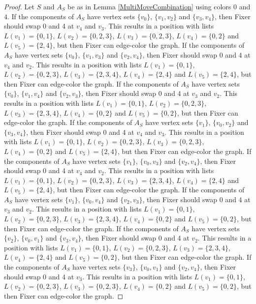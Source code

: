 \documentclass[12pt]{amsart}
\theoremstyle{plain}
\theoremstyle{definition}
\theoremstyle{remark}
\begin{document}
\begin{proof}
Let $S$ and $A_S$ be as in Lemma \ref{MultiMoveCombination} using colors $0$ and $4$. If the components of $A_S$ have vertex sets $\{v_0\}$, $\{v_1, v_2\}$ and $\{v_3, v_4\}$, then Fixer should swap 0 and 4 at $v_4$ and $v_3$. This results in a position with lists $L(v_1) = \{0, 1\}$, $L(v_2) = \{0, 2, 3\}$, $L(v_3) = \{0, 2, 3\}$, $L(v_4) = \{0, 2\}$ and $L(v_5) = \{2, 4\}$, but then Fixer can edge-color the graph.
If the components of $A_S$ have vertex sets $\{v_0\}$, $\{v_1, v_3\}$ and $\{v_2, v_4\}$, then Fixer should swap 0 and 4 at $v_4$ and $v_2$. This results in a position with lists $L(v_1) = \{0, 1\}$, $L(v_2) = \{0, 2, 3\}$, $L(v_3) = \{2, 3, 4\}$, $L(v_4) = \{2, 4\}$ and $L(v_5) = \{2, 4\}$, but then Fixer can edge-color the graph.
If the components of $A_S$ have vertex sets $\{v_0\}$, $\{v_1, v_4\}$ and $\{v_2, v_3\}$, then Fixer should swap 0 and 4 at $v_3$ and $v_2$. This results in a position with lists $L(v_1) = \{0, 1\}$, $L(v_2) = \{0, 2, 3\}$, $L(v_3) = \{2, 3, 4\}$, $L(v_4) = \{0, 2\}$ and $L(v_5) = \{0, 2\}$, but then Fixer can edge-color the graph.
If the components of $A_S$ have vertex sets $\{v_1\}$, $\{v_0, v_2\}$ and $\{v_3, v_4\}$, then Fixer should swap 0 and 4 at $v_4$ and $v_3$. This results in a position with lists $L(v_1) = \{0, 1\}$, $L(v_2) = \{0, 2, 3\}$, $L(v_3) = \{0, 2, 3\}$, $L(v_4) = \{0, 2\}$ and $L(v_5) = \{2, 4\}$, but then Fixer can edge-color the graph.
If the components of $A_S$ have vertex sets $\{v_1\}$, $\{v_0, v_3\}$ and $\{v_2, v_4\}$, then Fixer should swap 0 and 4 at $v_4$ and $v_2$. This results in a position with lists $L(v_1) = \{0, 1\}$, $L(v_2) = \{0, 2, 3\}$, $L(v_3) = \{2, 3, 4\}$, $L(v_4) = \{2, 4\}$ and $L(v_5) = \{2, 4\}$, but then Fixer can edge-color the graph.
If the components of $A_S$ have vertex sets $\{v_1\}$, $\{v_0, v_4\}$ and $\{v_2, v_3\}$, then Fixer should swap 0 and 4 at $v_3$ and $v_2$. This results in a position with lists $L(v_1) = \{0, 1\}$, $L(v_2) = \{0, 2, 3\}$, $L(v_3) = \{2, 3, 4\}$, $L(v_4) = \{0, 2\}$ and $L(v_5) = \{0, 2\}$, but then Fixer can edge-color the graph.
If the components of $A_S$ have vertex sets $\{v_2\}$, $\{v_0, v_1\}$ and $\{v_3, v_4\}$, then Fixer should swap 0 and 4 at $v_2$. This results in a position with lists $L(v_1) = \{0, 1\}$, $L(v_2) = \{0, 2, 3\}$, $L(v_3) = \{2, 3, 4\}$, $L(v_4) = \{2, 4\}$ and $L(v_5) = \{0, 2\}$, but then Fixer can edge-color the graph.
If the components of $A_S$ have vertex sets $\{v_3\}$, $\{v_0, v_1\}$ and $\{v_2, v_4\}$, then Fixer should swap 0 and 4 at $v_3$. This results in a position with lists $L(v_1) = \{0, 1\}$, $L(v_2) = \{0, 2, 3\}$, $L(v_3) = \{0, 2, 3\}$, $L(v_4) = \{0, 2\}$ and $L(v_5) = \{0, 2\}$, but then Fixer can edge-color the graph.

\end{proof}
\end{document}
